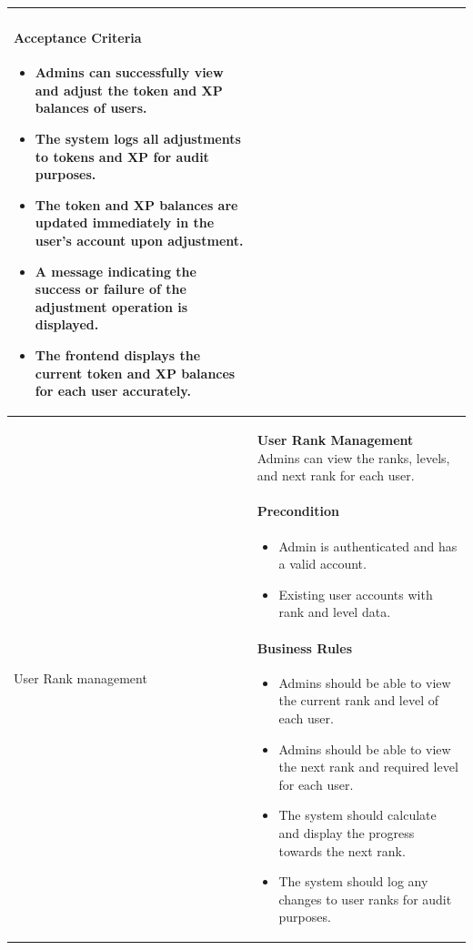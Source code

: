 \begin{longtable}{ | m{} | m{} | }
    \paragraph*{Acceptance Criteria} \mbox{} \newline
    \begin{itemize}
        \item Admins can successfully view and adjust the token and XP balances of users.
        \item The system logs all adjustments to tokens and XP for audit purposes.
        \item The token and XP balances are updated immediately in the user's account upon adjustment.
        \item A message indicating the success or failure of the adjustment operation is displayed.
        \item The frontend displays the current token and XP balances for each user accurately.
    \end{itemize}                                                                                                                                               \\
    \hline
    User Rank \newline management                                          & \textbf{User Rank Management} \newline Admins can view the ranks, levels, and next rank for each user.
    \paragraph*{Precondition} \mbox{} \newline
    \begin{itemize}
        \item Admin is authenticated and has a valid account.
        \item Existing user accounts with rank and level data.
    \end{itemize}   
    \paragraph*{Business Rules} \mbox{} \newline
    \begin{itemize}
        \item Admins should be able to view the current rank and level of each user.
        \item Admins should be able to view the next rank and required level for each user.
        \item The system should calculate and display the progress towards the next rank.
        \item The system should log any changes to user ranks for audit purposes.
    \end{itemize}

\end{longtable}
